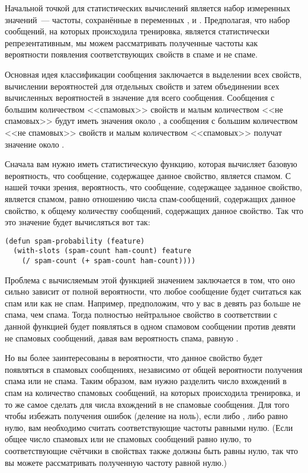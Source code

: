 Начальной точкой для статистических вычислений является набор измеренных значений~---
частоты, сохранённые в переменных ,  и
.  Предполагая, что набор сообщений, на которых происходила тренировка,
является статистически репрезентативным, мы можем рассматривать полученные частоты как
вероятности появления соответствующих свойств в спаме и не спаме.

Основная идея классификации сообщения заключается в выделении всех свойств, вычислении
вероятностей для отдельных свойств и затем объединении всех вычисленных вероятностей в
значение для всего сообщения.  Сообщения с большим количеством <<спамовых>> свойств и малым
количеством <<не спамовых>> будут иметь значения около , а сообщения с большим
количеством <<не спамовых>> свойств и малым количеством <<спамовых>> получат значение около
.

Сначала вам нужно иметь статистическую функцию, которая вычисляет базовую вероятность, что
сообщение, содержащее данное свойство, является спамом.  С нашей точки зрения,
вероятность, что сообщение, содержащее заданное свойство, является спамом, равно отношению
числа спам-сообщений, содержащих данное свойство, к общему количеству сообщений,
содержащих данное свойство.  Так что это значение будет вычисляться вот так:

\begin{lstlisting}
(defun spam-probability (feature)
  (with-slots (spam-count ham-count) feature
    (/ spam-count (+ spam-count ham-count))))
\end{lstlisting}

Проблема с вычисляемым этой функцией значением заключается в том, что оно сильно зависит
от полной вероятности, что любое сообщение будет считаться как спам или как не спам.
Например, предположим, что у вас в девять раз больше не спама, чем спама.  Тогда полностью
нейтральное свойство в соответствии с данной функцией будет появляться в одном спамовом
сообщении против девяти не спамовых сообщений, давая вам вероятность спама, равную
.

Но вы более заинтересованы в вероятности, что данное свойство будет появляться в спамовых
сообщениях, независимо от общей вероятности получения спама или не спама.  Таким образом,
вам нужно разделить число вхождений в спам на количество спамовых сообщений, на которых
происходила тренировка, и то же самое сделать для числа вхождений в не спамовые сообщения.
Для того чтобы избежать получения ошибок  (деление на ноль), если
либо , либо  равно нулю, вам необходимо считать
соответствующие частоты равными нулю. (Если общее число спамовых или не спамовых сообщений
равно нулю, то соответствующие счётчики в свойствах также должны быть равны нулю, так что
вы можете рассматривать полученную частоту равной нулю.)

